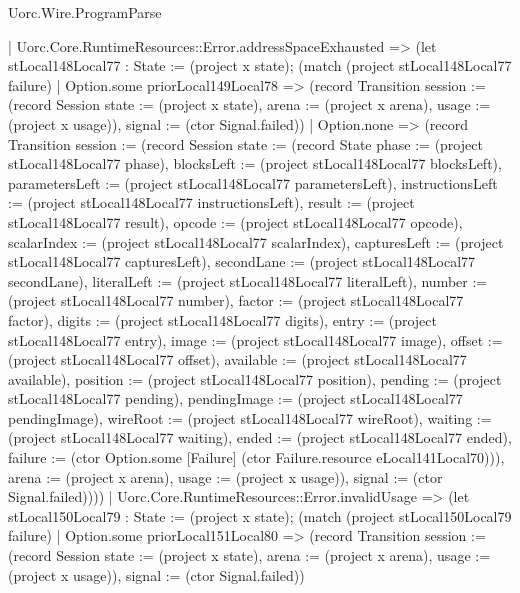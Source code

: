 \begin{lexlean}{Uorc.Wire.ProgramParse}
\begin{semanticmodule}
{      | Uorc.Core.RuntimeResources::Error.addressSpaceExhausted => (let stLocal148Local77 : State := (project x state); (match (project stLocal148Local77 failure)
        | Option.some priorLocal149Local78 => (record Transition {session := (record Session {state := (project x state), arena := (project x arena), usage := (project x usage)}), signal := (ctor Signal.failed)})
        | Option.none => (record Transition {session := (record Session {state := (record State {phase := (project stLocal148Local77 phase), blocksLeft := (project stLocal148Local77 blocksLeft), parametersLeft := (project stLocal148Local77 parametersLeft), instructionsLeft := (project stLocal148Local77 instructionsLeft), result := (project stLocal148Local77 result), opcode := (project stLocal148Local77 opcode), scalarIndex := (project stLocal148Local77 scalarIndex), capturesLeft := (project stLocal148Local77 capturesLeft), secondLane := (project stLocal148Local77 secondLane), literalLeft := (project stLocal148Local77 literalLeft), number := (project stLocal148Local77 number), factor := (project stLocal148Local77 factor), digits := (project stLocal148Local77 digits), entry := (project stLocal148Local77 entry), image := (project stLocal148Local77 image), offset := (project stLocal148Local77 offset), available := (project stLocal148Local77 available), position := (project stLocal148Local77 position), pending := (project stLocal148Local77 pending), pendingImage := (project stLocal148Local77 pendingImage), wireRoot := (project stLocal148Local77 wireRoot), waiting := (project stLocal148Local77 waiting), ended := (project stLocal148Local77 ended), failure := (ctor Option.some [Failure] (ctor Failure.resource eLocal141Local70))}), arena := (project x arena), usage := (project x usage)}), signal := (ctor Signal.failed)})))
      | Uorc.Core.RuntimeResources::Error.invalidUsage => (let stLocal150Local79 : State := (project x state); (match (project stLocal150Local79 failure)
        | Option.some priorLocal151Local80 => (record Transition {session := (record Session {state := (project x state), arena := (project x arena), usage := (project x usage)}), signal := (ctor Signal.failed)})
}
\end{semanticmodule}
\end{lexlean}
